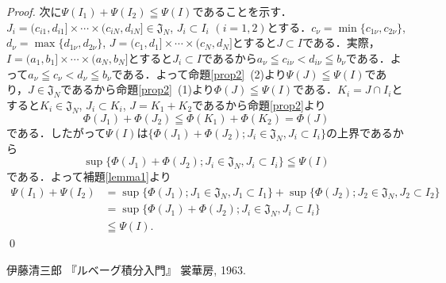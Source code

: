 \documentclass[12pt,a4paper]{jsarticle}
\newcommand{\frakJ}{\mathfrak{J}}
\begin{document}
\begin{proof}
    次に$\Psi(I_1) + \Psi(I_2) \leqq \Psi(I)$であることを示す．$J_i = (c_{i 1}, d_{i 1}] \times \cdots \times (c_{i N}, d_{i N}] \in \frakJ_N$, $J_i \subset I_i$ $(i = 1, 2)$とする．$c_\nu = \min\{c_{1 \nu}, c_{2 \nu}\}$, $d_\nu = \max\{d_{1 \nu}, d_{2 \nu}\}$, $J = (c_1, d_1] \times \cdots \times (c_N, d_N]$とすると$J \subset I$である．実際，$I = (a_1, b_1] \times \cdots \times (a_N, b_N]$とすると$J_i \subset I$であるから$a_\nu \leqq c_{i \nu} < d_{i \nu} \leqq b_\nu$である．よって$a_\nu \leqq c_\nu < d_\nu \leqq b_\nu$である．よって命題\ref{prop2}~(2)より$\Psi(J) \leqq \Psi(I)$であり，$J \in \frakJ_N$であるから命題\ref{prop2}~(1)より$\Phi(J) \leqq \Psi(I)$である．$K_i = J \cap I_i$とすると$K_i \in \frakJ_N$, $J_i \subset K_i$, $J = K_1 + K_2$であるから命題\ref{prop2}より
    \begin{equation*}
        \Phi(J_1) + \Phi(J_2) \leqq \Phi(K_1) + \Phi(K_2) = \Phi(J)
    \end{equation*}
    である．したがって$\Psi(I)$は$\{\Phi(J_1) + \Phi(J_2) ; J_i \in \frakJ_N, J_i \subset I_i\}$の上界であるから
    \begin{equation*}
        \sup\{\Phi(J_1) + \Phi(J_2) ; J_i \in \frakJ_N, J_i \subset I_i\} \leqq \Psi(I)
    \end{equation*}
    である．よって補題\ref{lemma1}より
    \begin{align*}
        \Psi(I_1) + \Psi(I_2)
        &= \sup\{\Phi(J_1) ; J_1 \in \frakJ_N, J_1 \subset I_1\} + \sup\{\Phi(J_2) ; J_2 \in \frakJ_N, J_2 \subset I_2\} \\
        &= \sup\{\Phi(J_1) + \Phi(J_2) ; J_i \in \frakJ_N, J_i \subset I_i\} \\
        &\leqq \Psi(I).
    \end{align*}
    \qed
\end{proof}

\begin{thebibliography}{99}
    伊藤清三郎
    『ルベーグ積分入門』
    裳華房, 1963.
\end{thebibliography}
\end{document}
